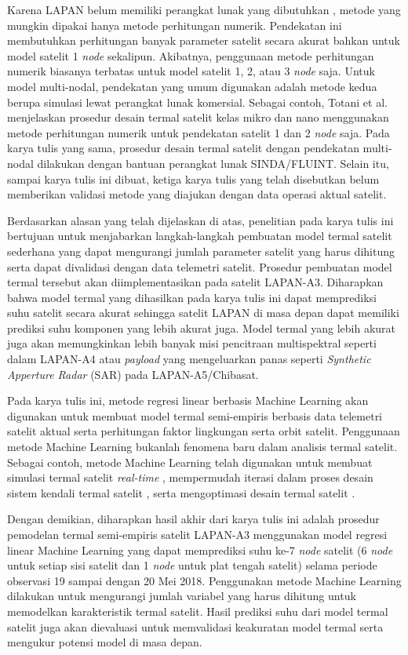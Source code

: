 Karena LAPAN belum memiliki perangkat lunak yang dibutuhkan
\cite{budiantoro2019}, metode yang mungkin dipakai hanya metode perhitungan
numerik. Pendekatan ini membutuhkan perhitungan banyak parameter satelit secara
akurat bahkan untuk model satelit 1 \textit{node} sekalipun. Akibatnya, penggunaan
metode perhitungan numerik biasanya terbatas untuk model satelit 1, 2, atau 3
\textit{node} saja. Untuk model multi-nodal, pendekatan yang umum digunakan adalah
metode kedua berupa simulasi lewat perangkat lunak komersial. Sebagai contoh,
Totani et al. \cite{totani2014} menjelaskan prosedur desain termal satelit
kelas mikro dan nano menggunakan metode perhitungan numerik untuk pendekatan
satelit 1 dan 2 \textit{node} saja. Pada karya tulis yang sama, prosedur desain termal
satelit dengan pendekatan multi-nodal dilakukan dengan bantuan perangkat lunak
SINDA/FLUINT. Selain itu, sampai karya tulis ini dibuat, ketiga karya tulis
yang telah disebutkan belum memberikan validasi metode yang diajukan dengan
data operasi aktual satelit.

Berdasarkan alasan yang telah dijelaskan di atas, penelitian pada karya tulis
ini bertujuan untuk menjabarkan langkah-langkah pembuatan model termal satelit
sederhana yang dapat mengurangi jumlah parameter satelit yang harus dihitung
serta dapat divalidasi dengan data telemetri satelit. Prosedur pembuatan model
termal tersebut akan diimplementasikan pada satelit LAPAN-A3. Diharapkan bahwa
model termal yang dihasilkan pada karya tulis ini dapat memprediksi suhu
satelit secara akurat sehingga satelit LAPAN di masa depan dapat memiliki
prediksi suhu komponen yang lebih akurat juga. Model termal yang lebih akurat
juga akan memungkinkan lebih banyak misi pencitraan multispektral seperti dalam
LAPAN-A4 atau \textit{payload} yang mengeluarkan panas seperti
\textit{Synthetic Apperture Radar} (SAR) pada LAPAN-A5/Chibasat.


Pada karya tulis ini, metode regresi linear berbasis Machine Learning akan
digunakan untuk membuat model termal semi-empiris berbasis data telemetri
satelit aktual serta perhitungan faktor lingkungan serta orbit satelit.
Penggunaan metode Machine Learning bukanlah fenomena baru dalam analisis termal
satelit. Sebagai contoh, metode Machine Learning telah digunakan untuk membuat
simulasi termal satelit \textit{real-time} \cite{junior2017}, mempermudah
iterasi dalam proses desain sistem kendali termal satelit \cite{escobar2016},
serta mengoptimasi desain termal satelit \cite{xiong2020}.

Dengan demikian, diharapkan hasil akhir dari karya tulis ini adalah prosedur
pemodelan termal semi-empiris satelit LAPAN-A3 menggunakan model regresi linear
Machine Learning yang dapat memprediksi suhu ke-7 \textit{node} satelit (6 \textit{node} untuk
setiap sisi satelit dan 1 \textit{node} untuk plat tengah satelit) selama periode
observasi 19 sampai dengan 20 Mei 2018. Penggunakan metode Machine Learning
dilakukan untuk mengurangi jumlah variabel yang harus dihitung untuk memodelkan
karakteristik termal satelit. Hasil prediksi suhu dari model termal satelit
juga akan dievaluasi untuk memvalidasi keakuratan model termal serta mengukur
potensi model di masa depan.

